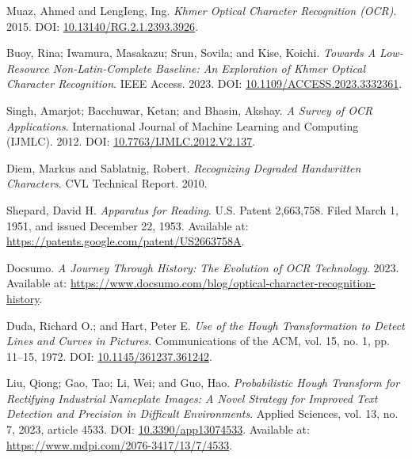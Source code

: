 {}


\label{ch:references} 

Muaz, Ahmed and LengIeng, Ing. 
\textit{Khmer Optical Character Recognition (OCR)}. 
2015. 
DOI: \href{https://doi.org/10.13140/RG.2.1.2393.3926}{10.13140/RG.2.1.2393.3926}.

Buoy, Rina; Iwamura, Masakazu; Srun, Sovila; and Kise, Koichi.
\textit{Towards A Low-Resource Non-Latin-Complete Baseline: An Exploration of Khmer Optical Character Recognition}.
IEEE Access.
2023.
DOI: \href{https://doi.org/10.1109/ACCESS.2023.3332361}{10.1109/ACCESS.2023.3332361}.

Singh, Amarjot; Bacchuwar, Ketan; and Bhasin, Akshay.
\textit{A Survey of OCR Applications}.
International Journal of Machine Learning and Computing (IJMLC).
2012.
DOI: \href{https://doi.org/10.7763/IJMLC.2012.V2.137}{10.7763/IJMLC.2012.V2.137}.

Diem, Markus and Sablatnig, Robert.
\textit{Recognizing Degraded Handwritten Characters}.
CVL Technical Report.
2010.

Shepard, David H.
\textit{Apparatus for Reading}.
U.S. Patent 2,663,758. Filed March 1, 1951, and issued December 22, 1953.
Available at: \href{https://patents.google.com/patent/US2663758A}{https://patents.google.com/patent/US2663758A}.

Docsumo.
\textit{A Journey Through History: The Evolution of OCR Technology}.
2023.
Available at: \href{https://www.docsumo.com/blog/optical-character-recognition-history}{https://www.docsumo.com/blog/optical-character-recognition-history}.

Duda, Richard O.; and Hart, Peter E.
\textit{Use of the Hough Transformation to Detect Lines and Curves in Pictures}.
Communications of the ACM, vol. 15, no. 1, pp. 11–15, 1972.
DOI: \href{https://doi.org/10.1145/361237.361242}{10.1145/361237.361242}.

Liu, Qiong; Gao, Tao; Li, Wei; and Guo, Hao.
\textit{Probabilistic Hough Transform for Rectifying Industrial Nameplate Images: A Novel Strategy for Improved Text Detection and Precision in Difficult Environments}.
Applied Sciences, vol. 13, no. 7, 2023, article 4533.
DOI: \href{https://doi.org/10.3390/app13074533}{10.3390/app13074533}.
Available at: \href{https://www.mdpi.com/2076-3417/13/7/4533}{https://www.mdpi.com/2076-3417/13/7/4533}.

